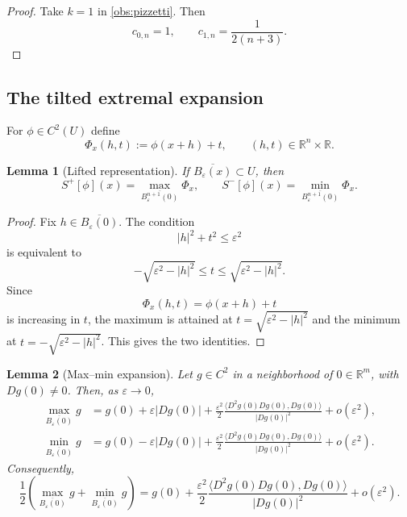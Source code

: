 \documentclass[12pt,reqno]{amsart}
\numberwithin{equation}{section}
\theoremstyle{plain}
\newtheorem{lemma}[lemma]{Lemma}
\theoremstyle{definition}
\theoremstyle{remark}
\newcommand{\R}{\mathbb{R}}
\newcommand{\Sp}{S^+}
\newcommand{\Sm}{S^-}
\begin{document}
\begin{proof}
Take $k=1$ in \cref{obs:pizzetti}. Then
\[
  c_{0,n}=1,
  \qquad
  c_{1,n}
  =
  \frac{1}{2(n+3)}.
\]
\end{proof}

\subsection{The tilted extremal expansion}
\label{subsec:pinf}

For $\phi\in C^2(U)$ define
\begin{equation}\label{eq:Phi-def}
  \Phi_x(h,t):=\phi(x+h)+t,
  \qquad
  (h,t)\in\R^n\times\R.
\end{equation}

\begin{lemma}[Lifted representation]
\label{lem:lift-id}
If $\overline{B_\varepsilon(x)}\subset U$, then
\[
  \Sp[\phi](x)
  =
  \max_{\overline{B_\varepsilon^{n+1}(0)}}\Phi_x,
  \qquad
  \Sm[\phi](x)
  =
  \min_{\overline{B_\varepsilon^{n+1}(0)}}\Phi_x.
\]
\end{lemma}

\begin{proof}
Fix $h\in\overline{B_\varepsilon(0)}$. The condition
\[
  |h|^2+t^2\le\varepsilon^2
\]
is equivalent to
\[
  -\sqrt{\varepsilon^2-|h|^2}
  \le
  t
  \le
  \sqrt{\varepsilon^2-|h|^2}.
\]
Since
\[
  \Phi_x(h,t)=\phi(x+h)+t
\]
is increasing in $t$, the maximum is attained at
$t=\sqrt{\varepsilon^2-|h|^2}$ and the minimum at
$t=-\sqrt{\varepsilon^2-|h|^2}$. This gives the two identities.
\end{proof}

\begin{lemma}[Max--min expansion]
\label{lem:max-min}
Let $g\in C^2$ in a neighborhood of $0\in\R^m$, with $Dg(0)\ne0$.
Then, as $\varepsilon\to0$,
\begin{align}
  \max_{\overline{B_\varepsilon(0)}}g
  &=
  g(0)
  +
  \varepsilon|Dg(0)|
  +
  \frac{\varepsilon^2}{2}
  \frac{
    \langle D^2g(0)Dg(0),Dg(0)\rangle
  }{
    |Dg(0)|^2
  }
  +
  o(\varepsilon^2),
  \label{eq:maxg}\\
  \min_{\overline{B_\varepsilon(0)}}g
  &=
  g(0)
  -
  \varepsilon|Dg(0)|
  +
  \frac{\varepsilon^2}{2}
  \frac{
    \langle D^2g(0)Dg(0),Dg(0)\rangle
  }{
    |Dg(0)|^2
  }
  +
  o(\varepsilon^2).
  \label{eq:ming}
\end{align}
Consequently,
\begin{equation}\label{eq:max-min-avg}
  \frac12
  \left(
    \max_{\overline{B_\varepsilon(0)}}g
    +
    \min_{\overline{B_\varepsilon(0)}}g
  \right)
  =
  g(0)
  +
  \frac{\varepsilon^2}{2}
  \frac{
    \langle D^2g(0)Dg(0),Dg(0)\rangle
  }{
    |Dg(0)|^2
  }
  +
  o(\varepsilon^2).
\end{equation}
\end{lemma}
\end{document}

